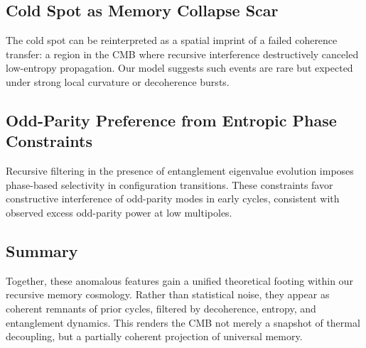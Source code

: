 \subsection*{Cold Spot as Memory Collapse Scar}
The cold spot can be reinterpreted as a spatial imprint of a failed coherence transfer: a region in the CMB where recursive interference destructively canceled low-entropy propagation. Our model suggests such events are rare but expected under strong local curvature or decoherence bursts.

\subsection*{Odd-Parity Preference from Entropic Phase Constraints}
Recursive filtering in the presence of entanglement eigenvalue evolution imposes phase-based selectivity in configuration transitions. These constraints favor constructive interference of odd-parity modes in early cycles, consistent with observed excess odd-parity power at low multipoles.

\subsection*{Summary}
Together, these anomalous features gain a unified theoretical footing within our recursive memory cosmology. Rather than statistical noise, they appear as coherent remnants of prior cycles, filtered by decoherence, entropy, and entanglement dynamics. This renders the CMB not merely a snapshot of thermal decoupling, but a partially coherent projection of universal memory.

